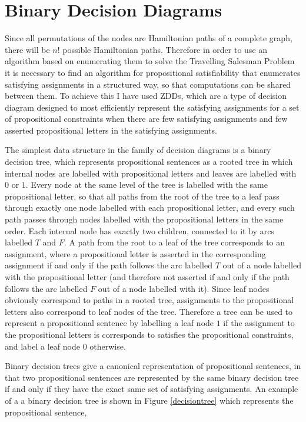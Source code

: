 \documentclass[12pt,a4paper,twoside,openright]{report}
\begin{document}
\section{Binary Decision Diagrams}
Since all permutations of the nodes are Hamiltonian paths of a complete graph, there will be $n!$ possible Hamiltonian paths. Therefore in order to use an algorithm based on enumerating them to solve the Travelling Salesman Problem it is necessary to find an algorithm for propositional satisfiability that enumerates satisfying assignments in a structured way, so that computations can be shared between them. To achieve this I have used ZDDs, which are a type of decision diagram designed to most efficiently represent the satisfying assignments for a set of propositional constraints when there are few satisfying assignments and few asserted propositional letters in the satisfying assignments.

The simplest data structure in the family of decision diagrams is a binary decision tree, which represents propositional sentences as a rooted tree in which internal nodes are labelled with propositional letters and leaves are labelled with $0$ or $1$. Every node at the same level of the tree is labelled with the same propositional letter, so that all paths from the root of the tree to a leaf pass through exactly one node labelled with each propositional letter, and every such path passes through nodes labelled with the propositional letters in the same order. Each internal node has exactly two children, connected to it by arcs labelled $T$ and $F$. A path from the root to a leaf of the tree corresponds to an assignment, where a propositional letter is asserted in the corresponding assignment if and only if the path follows the arc labelled $T$ out of a node labelled with the propositional letter (and therefore not asserted if and only if the path follows the arc labelled $F$ out of a node labelled with it). Since leaf nodes obviously correspond to paths in a rooted tree, assignments to the propositional letters also correspond to leaf nodes of the tree. Therefore a tree can be used to represent a propositional sentence by labelling a leaf node $1$ if the assignment to the propositional letters is corresponds to satisfies the propositional constraints, and label a leaf node $0$ otherwise.

Binary decision trees give a canonical representation of propositional sentences, in that two propositional sentences are represented by the same binary decision tree if and only if they have the exact same set of satisfying assignments. An example of a a binary decision tree is shown in Figure \ref{decisiontree} which represents the propositional sentence, 
\end{document}
